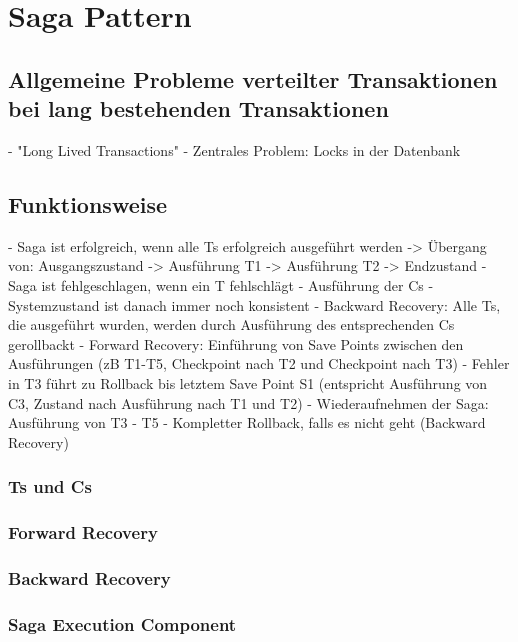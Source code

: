 \chapter{Saga Pattern}


\section{Allgemeine Probleme verteilter Transaktionen bei lang bestehenden Transaktionen}

- "Long Lived Transactions"
- Zentrales Problem: Locks in der Datenbank

\section{Funktionsweise}



- Saga ist erfolgreich, wenn alle Ts erfolgreich ausgeführt werden -> Übergang von: Ausgangszustand -> Ausführung T1 -> Ausführung T2 -> Endzustand
- Saga ist fehlgeschlagen, wenn ein T fehlschlägt
- Ausführung der Cs
- Systemzustand ist danach immer noch konsistent
- Backward Recovery: Alle Ts, die ausgeführt wurden, werden durch Ausführung des entsprechenden Cs gerollbackt
- Forward Recovery: Einführung von Save Points zwischen den Ausführungen (zB T1-T5, Checkpoint nach T2 und Checkpoint nach T3)
- Fehler in T3 führt zu Rollback bis letztem Save Point S1 (entspricht Ausführung von C3, Zustand nach Ausführung nach T1 und T2)
- Wiederaufnehmen der Saga: Ausführung von T3 - T5
- Kompletter Rollback, falls es nicht geht (Backward Recovery)

\subsection{Ts und Cs}

\subsection{Forward Recovery}

\subsection{Backward Recovery}

\subsection{Saga Execution Component}

